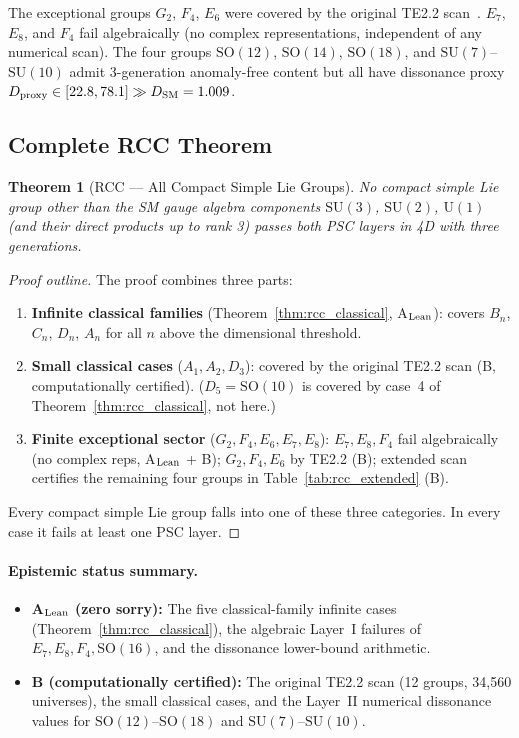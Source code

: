 \documentclass[11pt]{article}
\newtheorem{theorem}{Theorem}[section]
\theoremstyle{remark}
\begin{document}
\noindent The exceptional groups $G_2$, $F_4$, $E_6$ were covered by the original TE2.2 scan~\cite{SpivackNEMS05}.  $E_7$, $E_8$, and $F_4$ fail algebraically (no complex representations, independent of any numerical scan).  The four groups $\mathrm{SO}(12)$, $\mathrm{SO}(14)$, $\mathrm{SO}(18)$, and $\mathrm{SU}(7)$--$\mathrm{SU}(10)$ admit 3-generation anomaly-free content but all have dissonance proxy $D_{\rm proxy} \in [22.8, 78.1] \gg D_{\rm SM} = 1.009$.

\subsection{Complete RCC Theorem}

\begin{theorem}[RCC --- All Compact Simple Lie Groups]
\label{thm:rcc_complete}
No compact simple Lie group other than the SM gauge algebra components $\mathrm{SU}(3)$, $\mathrm{SU}(2)$, $\mathrm{U}(1)$ (and their direct products up to rank 3) passes both PSC layers in 4D with three generations.
\end{theorem}

\begin{proof}[Proof outline]
The proof combines three parts:
\begin{enumerate}[leftmargin=2em,itemsep=3pt]
  \item \textbf{Infinite classical families} (Theorem~\ref{thm:rcc_classical}, A$_{\rm Lean}$): covers $B_n$, $C_n$, $D_n$, $A_n$ for all $n$ above the dimensional threshold.
  \item \textbf{Small classical cases} ($A_1, A_2, D_3$): covered by the original TE2.2 scan (B, computationally certified).  ($D_5 = \mathrm{SO}(10)$ is covered by case~4 of Theorem~\ref{thm:rcc_classical}, not here.)
  \item \textbf{Finite exceptional sector} ($G_2, F_4, E_6, E_7, E_8$): $E_7, E_8, F_4$ fail algebraically (no complex reps, A$_{\rm Lean}$ + B); $G_2, F_4, E_6$ by TE2.2 (B); extended scan certifies the remaining four groups in Table~\ref{tab:rcc_extended} (B).
\end{enumerate}
Every compact simple Lie group falls into one of these three categories.  In every case it fails at least one PSC layer.
\end{proof}

\paragraph{Epistemic status summary.}
\begin{itemize}[leftmargin=1.5em,itemsep=2pt]
  \item \textbf{A$_{\rm Lean}$ (zero sorry):} The five classical-family infinite cases (Theorem~\ref{thm:rcc_classical}), the algebraic Layer~I failures of $E_7, E_8, F_4, \mathrm{SO}(16)$, and the dissonance lower-bound arithmetic.
  \item \textbf{B (computationally certified):} The original TE2.2 scan (12 groups, 34,560 universes), the small classical cases, and the Layer~II numerical dissonance values for $\mathrm{SO}(12)$--$\mathrm{SO}(18)$ and $\mathrm{SU}(7)$--$\mathrm{SU}(10)$.
\end{itemize}
\end{document}

